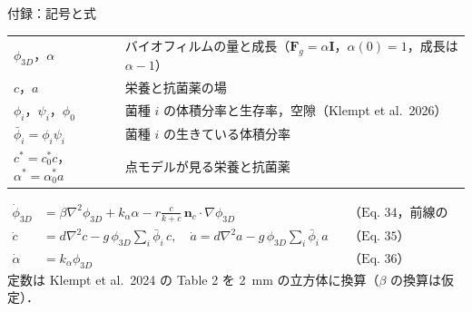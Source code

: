 \documentclass[aspectratio=169,11pt]{beamer}
\begin{document}
\appendix
\begin{frame}{付録：記号と式}
\small
\begin{tabular}{ll}
\toprule
$\phi_{3D}$，$\alpha$ & バイオフィルムの量と成長（$\mathbf F_g=\alpha\mathbf I$，$\alpha(0)=1$，成長は $\alpha-1$） \\
$c$，$a$ & 栄養と抗菌薬の場 \\
$\phi_i$，$\psi_i$，$\phi_0$ & 菌種 $i$ の体積分率と生存率，空隙（Klempt et al.\ 2026）\\
$\bar\phi_i=\phi_i\psi_i$ & 菌種 $i$ の生きている体積分率 \\
$c^*=c^*_0c$，$\alpha^*=\alpha^*_0a$ & 点モデルが見る栄養と抗菌薬 \\
\bottomrule
\end{tabular}
\begin{align*}
\dot\phi_{3D}&=\beta\nabla^2\phi_{3D}+k_\alpha\alpha-r\tfrac{c}{k+c}\,\mathbf n_c\cdot\nabla\phi_{3D} &&\text{（Eq.~34，前線の項あり）}\\
\dot c&=d\nabla^2c-g\,\phi_{3D}\textstyle\sum_i\bar\phi_i\,c,\quad \dot a=d\nabla^2a-g\,\phi_{3D}\textstyle\sum_i\bar\phi_i\,a &&\text{（Eq.~35）}\\
\dot\alpha&=k_\alpha\phi_{3D} &&\text{（Eq.~36）}
\end{align*}
定数は Klempt et al.\ 2024 の Table 2 を 2~mm の立方体に換算（$\beta$ の換算は仮定）．
\end{frame}
\end{document}
